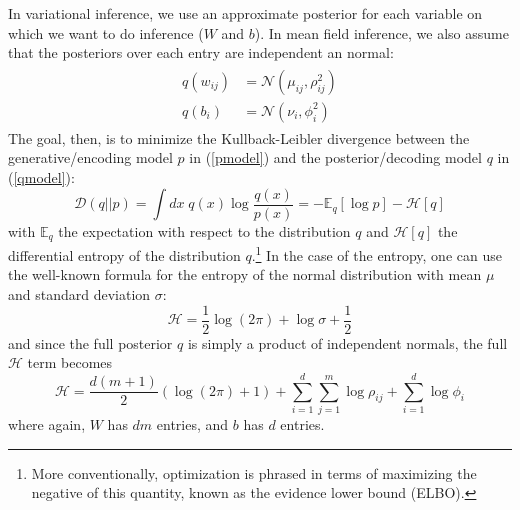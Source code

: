 \documentclass[10pt]{article}
\begin{document}
In variational inference, we use an approximate posterior for each variable on which we want to do inference ($W$ and $b$). In mean field inference, we also assume that the posteriors over each entry are independent an normal:
\begin{align}
    \label{qmodel}
    \begin{split}
        q(w_{ij}) &= \mathcal{N}(\mu_{ij}, \rho^2_{ij}) \\
        q(b_{i}) &= \mathcal{N}(\nu_{i}, \phi^2_{i})
    \end{split}
\end{align}
The goal, then, is to minimize the Kullback-Leibler divergence between the generative/encoding model $p$ in (\ref{pmodel}) and the posterior/decoding model $q$ in (\ref{qmodel}):
\begin{equation}
    \mathcal{D}(q||p) = \int\! dx\; q(x) \log \frac{q(x)}{p(x)} = -\mathbb{E}_q[\log p] - \mathcal{H}[q]
\end{equation}
with $\mathbb{E}_q$ the expectation with respect to the distribution $q$ and $\mathcal{H}[q]$ the differential entropy of the distribution $q$.\footnote{More conventionally, optimization is phrased in terms of maximizing the negative of this quantity, known as the evidence lower bound (ELBO).} In the case of the entropy, one can use the well-known formula for the entropy of the normal distribution with mean $\mu$ and standard deviation $\sigma$:
\begin{equation}
    \mathcal{H} = \frac{1}{2}\log (2\pi) + \log \sigma + \frac{1}{2}
\end{equation}
and since the full posterior $q$ is simply a product of independent normals, the full $\mathcal{H}$ term becomes
\begin{equation}
    \mathcal{H} = \frac{d(m + 1)}{2}(\log (2\pi) + 1) + \sum_{i=1}^d\sum_{j=1}^m \log \rho_{ij} + \sum_{i=1}^d \log \phi_i
\end{equation}
where again, $W$ has $dm$ entries, and $b$ has $d$ entries.
\end{document}
